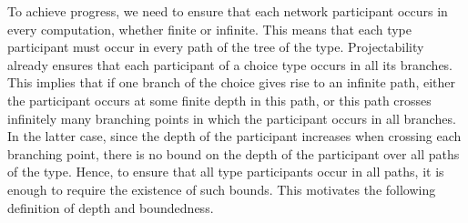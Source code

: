  To achieve progress, we need to ensure that each network
participant occurs in every computation, whether finite or
infinite. This means that each type participant must occur in every
path of the tree of the type. Projectability already ensures that each
participant of a choice type occurs in all its branches. This implies
that if one branch of the choice gives rise to an infinite path,
either the participant occurs at some finite depth in this path, or
this path crosses infinitely many branching points in which the
participant occurs in all branches. In the latter case, since the
depth of the participant increases when crossing each branching point,
there is no bound on the depth of the participant over all paths of
the type. Hence, to ensure that all type participants occur in all 
paths, it is enough to require the existence of such bounds. This
motivates the following definition of depth and boundedness.  

